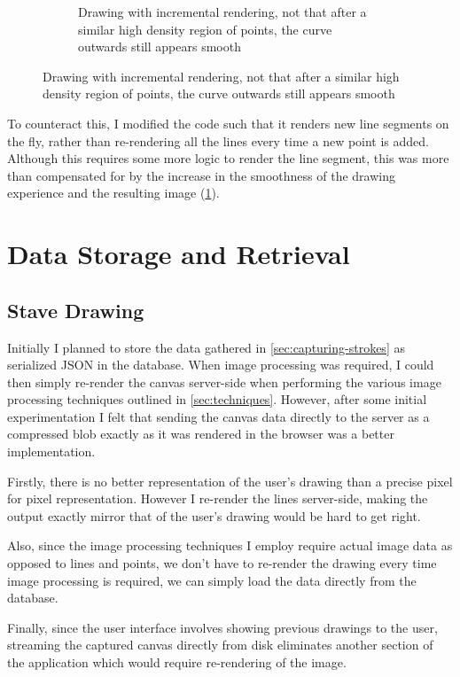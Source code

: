 \begin{figure}[H]
\begin{subfigure}[b]{.49\linewidth}
      \caption{Drawing with incremental rendering, not that after a similar high density region of points, the curve outwards still appears smooth}
      \label{fig:drawing-lag-smooth}
    \end{subfigure}
    
  \label{Drawing Lag}
    
\end{figure}

To counteract this, I modified the code such that it renders new line segments on the fly, rather than re-rendering all the lines every time a new point is added. Although this requires some more logic to render the line segment, this was more than compensated for by the increase in the smoothness of the drawing experience and the resulting image (\cref{fig:drawing-lag-smooth}).

\section{Data Storage and Retrieval}

\subsection{Stave Drawing}
Initially I planned to store the data gathered in \cref{sec:capturing-strokes} as serialized JSON in the database. When image processing was required, I could then simply re-render the canvas server-side when performing the various image processing techniques outlined in \cref{sec:techniques}. However, after some initial experimentation I felt that sending the canvas data directly to the server as a compressed blob exactly as it was rendered in the browser was a better implementation.

Firstly, there is no better representation of the user's drawing than a precise pixel for pixel representation. However I re-render the lines server-side, making the output exactly mirror that of the user's drawing would be hard to get right.

Also, since the image processing techniques I employ require actual image data as opposed to lines and points, we don't have to re-render the drawing every time image processing is required, we can simply load the data directly from the database.

Finally, since the user interface involves showing previous drawings to the user, streaming the captured canvas directly from disk eliminates another section of the application which would require re-rendering of the image.

